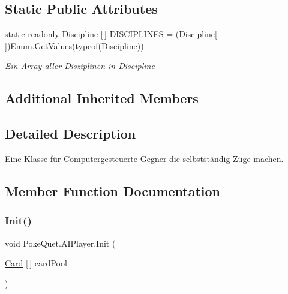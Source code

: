 \subsection*{Static Public Attributes}
\begin{DoxyCompactItemize}
\item 
static readonly \mbox{\hyperlink{namespace_poke_quet_aa425f1b8cf90847021fe1177d6a7199d}{Discipline}} \mbox{[}$\,$\mbox{]} \mbox{\hyperlink{class_poke_quet_1_1_a_i_player_a72ab201b6fd3e18713da18d17824179a}{D\+I\+S\+C\+I\+P\+L\+I\+N\+ES}} = (\mbox{\hyperlink{namespace_poke_quet_aa425f1b8cf90847021fe1177d6a7199d}{Discipline}}\mbox{[}$\,$\mbox{]})Enum.\+Get\+Values(typeof(\mbox{\hyperlink{namespace_poke_quet_aa425f1b8cf90847021fe1177d6a7199d}{Discipline}}))
\begin{DoxyCompactList}\small\item\em Ein Array aller Disziplinen in \mbox{\hyperlink{namespace_poke_quet_aa425f1b8cf90847021fe1177d6a7199d}{Discipline}} \end{DoxyCompactList}\end{DoxyCompactItemize}
\subsection*{Additional Inherited Members}


\subsection{Detailed Description}
Eine Klasse für Computergesteuerte Gegner die selbstständig Züge machen. 



\subsection{Member Function Documentation}
\mbox{\label{class_poke_quet_1_1_a_i_player_a91da43db7587617dbfe7858a6fafd434}} 
\subsubsection{\texorpdfstring{Init()}{Init()}}
{\footnotesize\ttfamily void Poke\+Quet.\+A\+I\+Player.\+Init (\begin{DoxyParamCaption}\item[{\mbox{\hyperlink{class_poke_quet_1_1_card}{Card}} \mbox{[}$\,$\mbox{]}}]{card\+Pool }\end{DoxyParamCaption})\hspace{0.3cm}{\ttfamily [inline]}}



